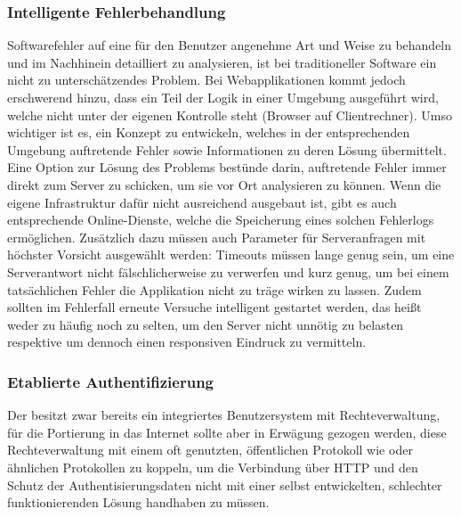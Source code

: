 \subsubsection{Intelligente Fehlerbehandlung}
Softwarefehler auf eine für den Benutzer angenehme Art und Weise zu behandeln und im Nachhinein detailliert zu analysieren, ist bei traditioneller Software ein nicht zu unterschätzendes Problem. Bei Webapplikationen kommt jedoch erschwerend hinzu, dass ein Teil der Logik in einer Umgebung ausgeführt wird, welche nicht unter der eigenen Kontrolle steht (Browser auf Clientrechner). Umso wichtiger ist es, ein Konzept zu entwickeln, welches in der entsprechenden Umgebung auftretende Fehler sowie Informationen zu deren Lösung übermittelt. Eine Option zur Lösung des Problems bestünde darin, auftretende Fehler immer direkt zum Server zu schicken, um sie vor Ort analysieren zu können. Wenn die eigene Infrastruktur dafür nicht ausreichend ausgebaut ist, gibt es auch entsprechende Online-Dienste, welche die Speicherung eines solchen Fehlerlogs ermöglichen. Zusätzlich dazu müssen auch Parameter für Serveranfragen mit höchster Vorsicht ausgewählt werden: Timeouts müssen lange genug sein, um eine Serverantwort nicht fälschlicherweise zu verwerfen und kurz genug, um bei einem tatsächlichen Fehler die Applikation nicht zu träge wirken zu lassen. Zudem sollten im Fehlerfall erneute Versuche intelligent gestartet werden, das heißt weder zu häufig noch zu selten, um den Server nicht unnötig zu belasten respektive um dennoch einen responsiven Eindruck zu vermitteln.

\subsubsection{Etablierte Authentifizierung}
Der  besitzt zwar bereits ein integriertes Benutzersystem mit Rechteverwaltung, für die Portierung in das Internet sollte aber in Erwägung gezogen werden, diese Rechteverwaltung mit einem oft genutzten, öffentlichen Protokoll wie  oder ähnlichen Protokollen zu koppeln, um die Verbindung über HTTP und den Schutz der Authentisierungsdaten nicht mit einer selbst entwickelten, schlechter funktionierenden Lösung handhaben zu müssen.

